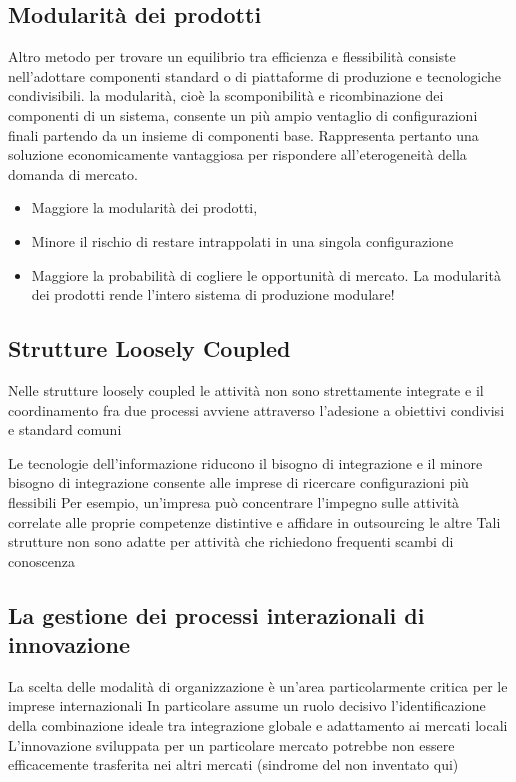 \documentclass{article}
\begin{document}
\subsection{Modularità dei prodotti}
Altro metodo per trovare un equilibrio tra efficienza e flessibilità
consiste nell’adottare componenti standard o di piattaforme di
produzione e tecnologiche condivisibili.
la modularità, cioè la scomponibilità e ricombinazione dei componenti
di un sistema, consente un più ampio ventaglio di configurazioni
finali partendo da un insieme di componenti base.
Rappresenta pertanto una soluzione economicamente vantaggiosa per
rispondere all’eterogeneità della domanda di mercato.
\begin{itemize}
\item  Maggiore la modularità dei prodotti,
\item  Minore il rischio di restare intrappolati in una singola configurazione
\item Maggiore la probabilità di cogliere le opportunità di mercato.
La modularità dei prodotti rende l’intero sistema di produzione modulare!
\end{itemize}


\subsection{Strutture Loosely Coupled}
Nelle strutture loosely coupled le attività non
sono strettamente integrate e il coordinamento
fra due processi avviene attraverso l’adesione
a obiettivi condivisi e standard comuni

Le tecnologie dell’informazione riducono il bisogno di integrazione e il
minore bisogno di integrazione consente alle imprese di ricercare
configurazioni più flessibili
Per esempio, un’impresa può concentrare
l’impegno sulle attività correlate alle proprie
competenze distintive e affidare in outsourcing
le altre
Tali strutture non sono adatte per attività che richiedono frequenti scambi
di conoscenza

\subsection{La gestione dei processi interazionali di innovazione}
La scelta delle modalità di organizzazione è
un’area particolarmente critica per le imprese
internazionali
In particolare assume un ruolo decisivo
l’identificazione della combinazione ideale tra
integrazione globale e adattamento ai mercati
locali
L’innovazione sviluppata per un particolare mercato
potrebbe non essere efficacemente trasferita nei
altri mercati (sindrome del non inventato qui)
\end{document}
